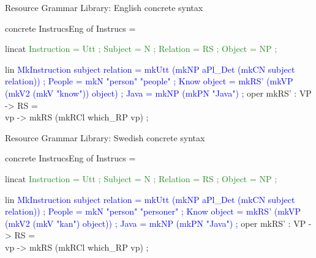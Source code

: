 \begin{frame}[fragile]{Resource Grammar Library: English concrete syntax} \pause
\begin{semiverbatim}
concrete InstrucsEng of Instrucs = {
  lincat\textcolor{ForestGreen}{
    Instruction = \textcolor{Type}{Utt} ;
    Subject = \textcolor{Type}{N} ;
    Relation = \textcolor{Type}{RS} ;
    Object = \textcolor{Type}{NP} ;}\pause

  lin \textcolor{Blue}{
   MkInstruction subject relation = 
            mkUtt (mkNP aPl_Det (mkCN subject relation)) ;
   People = mkN \textcolor{String}{"person" "people"} ;
   Know object = mkRS' (mkVP (mkV2 (mkV \textcolor{String}{"know"})) object) ;
   Java = mkNP (mkPN \textcolor{String}{"Java"}) ; }
  oper
     mkRS' : \textcolor{Type}{VP} -> \textcolor{Type}{RS} = \\vp -> mkRS (mkRCl which_RP vp) ;
}
\end{semiverbatim}
\end{frame}

\begin{frame}[fragile]{Resource Grammar Library: Swedish concrete syntax}
\begin{semiverbatim}
concrete InstrucsEng of Instrucs = {
  lincat\textcolor{ForestGreen}{
    Instruction = \textcolor{Type}{Utt} ;
    Subject = \textcolor{Type}{N} ;
    Relation = \textcolor{Type}{RS} ;
    Object = \textcolor{Type}{NP} ;}

  lin\textcolor{Blue}{
   MkInstruction subject relation = 
            mkUtt (mkNP aPl_Det (mkCN subject relation)) ;
   People = mkN \textcolor{String}{"person" "personer"} ;
   Know object = mkRS' (mkVP (mkV2 (mkV \textcolor{String}{"kan"}) object)) ;
   Java = mkNP (mkPN \textcolor{String}{"Java"}) ; }
  oper
     mkRS' : \textcolor{Type}{VP} -> \textcolor{Type}{RS} = \\vp -> mkRS (mkRCl which_RP vp) ;
}
\end{semiverbatim}
\end{frame}

\begin{frame}{}
\end{frame}


